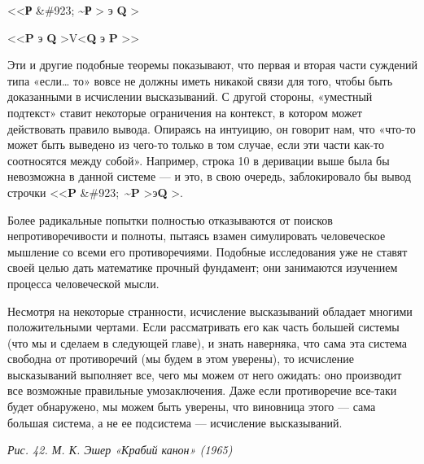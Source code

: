 \textless\textless{}\textbf{Р} \&\#923; \textbf{\textasciitilde Р} \textgreater{} э \textbf{Q} \textgreater{}

\textless\textless{}\textbf{P} э \textbf{Q} \textgreater V\textless{}\textbf{Q} э \textbf{P} \textgreater\textgreater{}

Эти и другие подобные теоремы показывают, что первая и вторая части суждений типа «если\ldots{} то» вовсе не должны иметь никакой связи для того, чтобы быть доказанными в исчислении высказываний. С другой стороны, «уместный подтекст» ставит некоторые ограничения на контекст, в котором может действовать правило вывода. Опираясь на интуицию, он говорит нам, что «что-то может быть выведено из чего-то только в том случае, если эти части как-то соотносятся между собой». Например, строка 10 в деривации выше была бы невозможна в данной системе --- и это, в свою очередь, заблокировало бы вывод строчки \textless\textless{}\textbf{P} \&\#923;~\textbf{\textasciitilde P} \textgreater э\textbf{Q} \textgreater.

Более радикальные попытки полностью отказываются от поисков непротиворечивости и полноты, пытаясь взамен симулировать человеческое мышление со всеми его противоречиями. Подобные исследования уже не ставят своей целью дать математике прочный фундамент; они занимаются изучением процесса человеческой мысли.

Несмотря на некоторые странности, исчисление высказываний обладает многими положительными чертами. Если рассматривать его как часть большей системы (что мы и сделаем в следующей главе), и знать наверняка, что сама эта система свободна от противоречий (мы будем в этом уверены), то исчисление высказываний выполняет все, чего мы можем от него ожидать: оно производит все возможные правильные умозаключения. Даже если противоречие все-таки будет обнаружено, мы можем быть уверены, что виновница этого --- сама большая система, а не ее подсистема --- исчисление высказываний.

\emph{Рис. 42. М. К. Эшер «Крабий канон» (1965)}

